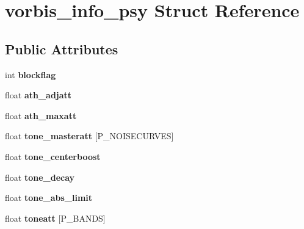 \hypertarget{structvorbis__info__psy}{\section{vorbis\+\_\+info\+\_\+psy Struct Reference}
\label{structvorbis__info__psy}
}
\subsection*{Public Attributes}
\begin{DoxyCompactItemize}
\item 
\hypertarget{structvorbis__info__psy_a884dea13b7446c8f28f40d5ae3faa144}{int {\bfseries blockflag}}\label{structvorbis__info__psy_a884dea13b7446c8f28f40d5ae3faa144}

\item 
\hypertarget{structvorbis__info__psy_a299a4a5373e48f994fee99cc701299e7}{float {\bfseries ath\+\_\+adjatt}}\label{structvorbis__info__psy_a299a4a5373e48f994fee99cc701299e7}

\item 
\hypertarget{structvorbis__info__psy_a59d8b44072c5de4de4a7a79b30cf0595}{float {\bfseries ath\+\_\+maxatt}}\label{structvorbis__info__psy_a59d8b44072c5de4de4a7a79b30cf0595}

\item 
\hypertarget{structvorbis__info__psy_a254bb09eb0de3cf794063ad1102b7a8c}{float {\bfseries tone\+\_\+masteratt} \mbox{[}P\+\_\+\+N\+O\+I\+S\+E\+C\+U\+R\+V\+E\+S\mbox{]}}\label{structvorbis__info__psy_a254bb09eb0de3cf794063ad1102b7a8c}

\item 
\hypertarget{structvorbis__info__psy_acc3f82d8c41c63e6e35d2cb451d72069}{float {\bfseries tone\+\_\+centerboost}}\label{structvorbis__info__psy_acc3f82d8c41c63e6e35d2cb451d72069}

\item 
\hypertarget{structvorbis__info__psy_ac10d4f96b564c11d017a2403f23914d9}{float {\bfseries tone\+\_\+decay}}\label{structvorbis__info__psy_ac10d4f96b564c11d017a2403f23914d9}

\item 
\hypertarget{structvorbis__info__psy_adea96fad862c5291d520454d6a029876}{float {\bfseries tone\+\_\+abs\+\_\+limit}}\label{structvorbis__info__psy_adea96fad862c5291d520454d6a029876}

\item 
\hypertarget{structvorbis__info__psy_ab8ef339e8d8ae469c1ae7ba706534a91}{float {\bfseries toneatt} \mbox{[}P\+\_\+\+B\+A\+N\+D\+S\mbox{]}}\label{structvorbis__info__psy_ab8ef339e8d8ae469c1ae7ba706534a91}


\end{DoxyCompactItemize}
